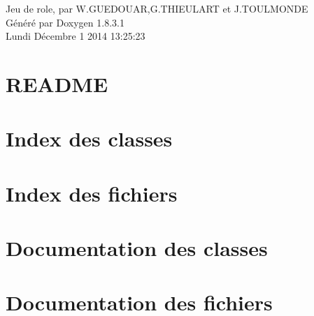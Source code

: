 \documentclass{book}
\begin{document}
\hypersetup{pageanchor=false,citecolor=blue}
\begin{titlepage}
\vspace*{7cm}
\begin{center}
{\Large Jeu de role, par W.\-G\-U\-E\-D\-O\-U\-A\-R,G.\-T\-H\-I\-E\-U\-L\-A\-R\-T et J.\-T\-O\-U\-L\-M\-O\-N\-D\-E }\\
\vspace*{1cm}
{\large Généré par Doxygen 1.8.3.1}\\
\vspace*{0.5cm}
{\small Lundi Décembre 1 2014 13:25:23}\\
\end{center}
\end{titlepage}
\clearemptydoublepage
{}
\tableofcontents
\clearemptydoublepage
{}
\hypersetup{pageanchor=true,citecolor=blue}
\chapter{R\-E\-A\-D\-M\-E}
\label{md_README}
\hypertarget{md_README}{}

\chapter{Index des classes}

\chapter{Index des fichiers}

\chapter{Documentation des classes}










\chapter{Documentation des fichiers}











\printindex
\end{document}
